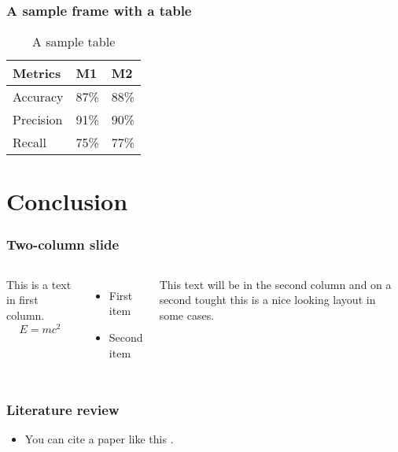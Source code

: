 \documentclass{beamer}
\begin{document}
\begin{frame}
\frametitle{A sample frame with a table}

\begin{table}[ht]
\caption{A sample table}
\label{T1}
\centering
\begin{tabular}{p{1.5cm}|p{1.5cm}|p{1.5cm}}
\hline
Metrics   &   M1 &	M2	\\
\hline
Accuracy  &  87\% &	88\%	\\
Precision &  91\% &	90\%	\\
Recall	  & 75\% &	77\%	\\
\hline
\end{tabular}
\end{table}

\end{frame}

\section{Conclusion}

\begin{frame}
\frametitle{Two-column slide}

\begin{columns}


This is a text in first column.
$$E=mc^2$$
\begin{itemize}
\item First item
\item Second item
\end{itemize}

This text will be in the second column
and on a second tought this is a nice looking
layout in some cases.
\end{columns}
\end{frame}

\begin{frame}
\frametitle{Literature review}
\begin{itemize}
\item You can cite a paper like this \cite{team2015common,eiram2013cvssv2}.
\end{itemize}
\end{frame}
\end{document}
